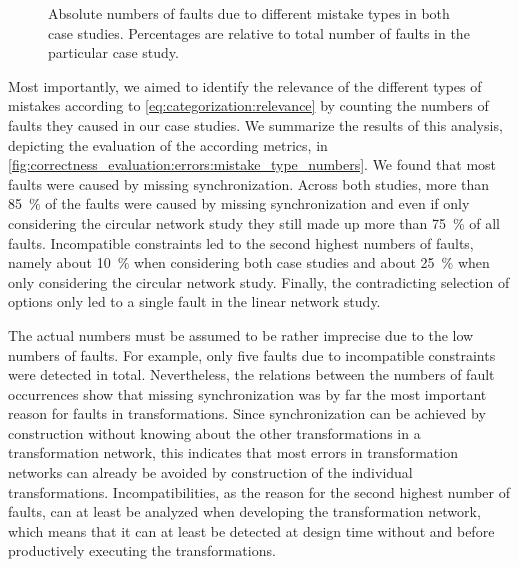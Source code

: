 \begin{figure}
    
    \caption[Number of occurrences of mistake types]{Absolute numbers of faults due to different mistake types in both case studies. Percentages are relative to total number of faults in the particular case study.}
    \label{fig:correctness_evaluation:errors:mistake_type_numbers}
\end{figure}

Most importantly, we aimed to identify the relevance of the different types of mistakes according to \autoref{eq:categorization:relevance} by counting the numbers of faults they caused in our case studies.
We summarize the results of this analysis, depicting the evaluation of the according metrics, in \autoref{fig:correctness_evaluation:errors:mistake_type_numbers}.
We found that most faults were caused by missing synchronization.
Across both studies, more than \SI{85}{\percent} of the faults were caused by missing synchronization and even if only considering the circular network study they still made up more than \SI{75}{\percent} of all faults.
Incompatible constraints led to the second highest numbers of faults, namely about \SI{10}{\percent} when considering both case studies and about \SI{25}{\percent} when only considering the circular network study.
Finally, the contradicting selection of options only led to a single fault in the linear network study.

The actual numbers must be assumed to be rather imprecise due to the low numbers of faults.
For example, only five faults due to incompatible constraints were detected in total.
Nevertheless, the relations between the numbers of fault occurrences show that missing synchronization was by far the most important reason for faults in transformations.
Since synchronization can be achieved by construction without knowing about the other transformations in a transformation network, this indicates that most errors in transformation networks can already be avoided by construction of the individual transformations.
Incompatibilities, as the reason for the second highest number of faults, can at least be analyzed when developing the transformation network, which means that it can at least be detected at design time without and before productively executing the transformations.



